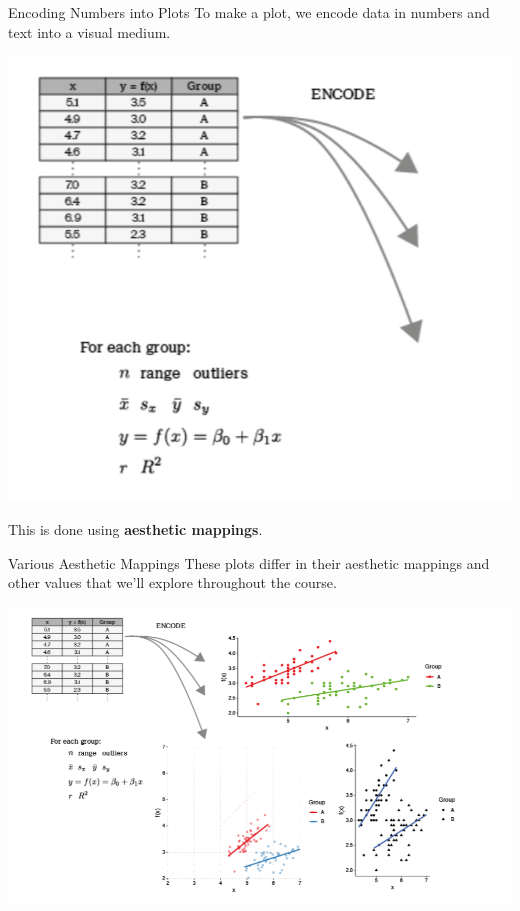 \documentclass[
  ignorenonframetext,
]{beamer}
\begin{document}
\begin{frame}{Encoding Numbers into Plots}
\label{encoding-numbers-into-plots}
To make a plot, we encode data in numbers and text into a visual medium.

\includegraphics{../images/im171.png}

This is done using \textbf{aesthetic mappings}.
\end{frame}

\begin{frame}{Various Aesthetic Mappings}
\label{various-aesthetic-mappings}
These plots differ in their aesthetic mappings and other values that
we'll explore throughout the course.

\includegraphics{../images/im172.png}
\end{frame}
\end{document}
